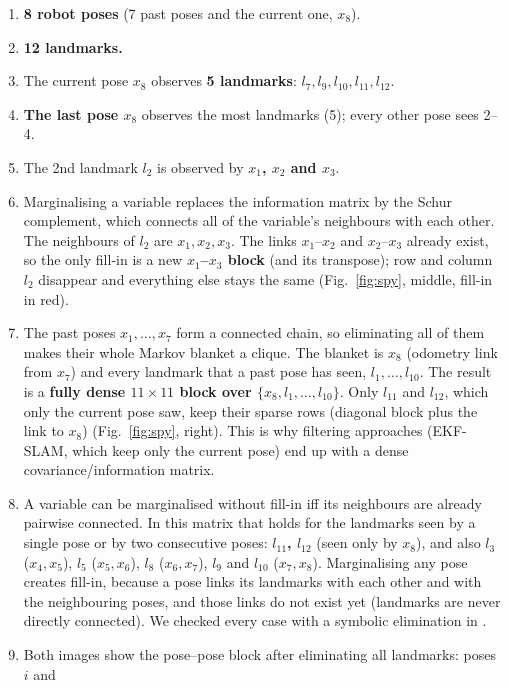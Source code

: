 \begin{enumerate}
\item \textbf{8 robot poses} (7 past poses and the current one, $x_8$).
\item \textbf{12 landmarks.}
\item The current pose $x_8$ observes \textbf{5 landmarks}: $l_7, l_9, l_{10}, l_{11}, l_{12}$.
\item \textbf{The last pose $x_8$} observes the most landmarks (5); every other pose sees 2--4.
\item The 2nd landmark $l_2$ is observed by \textbf{$x_1$, $x_2$ and $x_3$}.
\item Marginalising a variable replaces the information matrix by the Schur complement, which
  connects all of the variable's neighbours with each other. The neighbours of $l_2$ are
  $x_1,x_2,x_3$. The links $x_1$--$x_2$ and $x_2$--$x_3$ already exist, so the only fill-in
  is a new \textbf{$x_1$--$x_3$ block} (and its transpose); row and column $l_2$ disappear and
  everything else stays the same (Fig.~\ref{fig:spy}, middle, fill-in in red).
\item The past poses $x_1,\dots,x_7$ form a connected chain, so eliminating all of them
  makes their whole Markov blanket a clique. The blanket is $x_8$ (odometry link from $x_7$)
  and every landmark that a past pose has seen, $l_1,\dots,l_{10}$. The result is a
  \textbf{fully dense $11\times11$ block over $\{x_8,l_1,\dots,l_{10}\}$}. Only $l_{11}$ and
  $l_{12}$, which only the current pose saw, keep their sparse rows (diagonal block plus the
  link to $x_8$) (Fig.~\ref{fig:spy}, right). This is why filtering approaches (EKF-SLAM,
  which keep only the current pose) end up with a dense covariance/information matrix.
\item A variable can be marginalised without fill-in iff its neighbours are already pairwise
  connected. In this matrix that holds for the landmarks seen by a single pose or by two
  consecutive poses: \textbf{$l_{11}$, $l_{12}$} (seen only by $x_8$), and also $l_3$ ($x_4,x_5$),
  $l_5$ ($x_5,x_6$), $l_8$ ($x_6,x_7$), $l_9$ and $l_{10}$ ($x_7,x_8$). Marginalising any pose
  creates fill-in, because a pose links its landmarks with each other and with the
  neighbouring poses, and those links do not exist yet (landmarks are never directly
  connected). We checked every case with a symbolic elimination in
  .
\item Both images show the pose--pose block after eliminating all landmarks: poses $i$ and

\end{enumerate}
